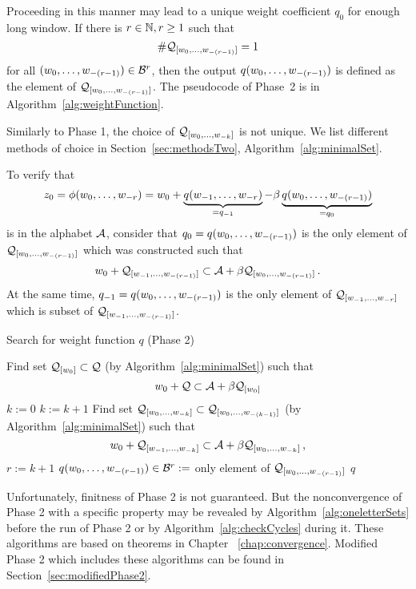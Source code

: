     Proceeding in this manner may lead to a unique weight coefficient $q_0$ for enough long window.     
    If there is $r\in\mathbb{N}, r\geq 1$ such that 
    $$
    \#\mathcal{Q}_{[w_{0}, \dots, w_{-(r-1)}]}=1
    $$
    for all $(w_{0}, \dots, w_{-(r-1)}) \in \mathcal{B}^r$, then the output $q(w_{0}, \dots, w_{-(r-1)})$ is defined as the element of $\mathcal{Q}_{[w_{0}, \dots, w_{-(r-1)}]}$. The pseudocode of Phase~2 is in  Algorithm~\ref{alg:weightFunction}. 
    
    Similarly to Phase 1, the choice of $\mathcal{Q}_{[w_{0}, \dots, w_{-k}]}$ is not unique. We list different methods of choice in Section~\ref{sec:methodsTwo}, Algorithm~\ref{alg:minimalSet}.
    
        
    To verify that 
$$
	z_0=\phi(w_{0}, \dots, w_{-r})=w_0+ \underbrace{q(w_{-1}, \dots, w_{-r})}_{=q_{-1}} - \beta \underbrace{q(w_{0}, \dots, w_{-(r-1)})}_{=q_0}
$$    
is in the alphabet $\mathcal{A}$, consider that $q_0=q(w_{0}, \dots, w_{-(r-1)})$ is the only element of $\mathcal{Q}_{[w_{0}, \dots, w_{-(r-1)}]}$ which was constructed such that 
$$
w_0 + \mathcal{Q}_{[w_{-1}, \dots, w_{-(r-1)}]} \subset \mathcal{A} +\beta \mathcal{Q}_{[w_{0}, \dots, w_{-(r-1)}]}\,.
$$
At the same time, $q_{-1}=q(w_{0}, \dots, w_{-(r-1)})$ is the only element of $\mathcal{Q}_{[w_{-1}, \dots, w_{-r}]}$ which is subset of $\mathcal{Q}_{[w_{-1}, \dots, w_{-(r-1)}]}$.

    

    
\begin{algorithm}
  \caption{Search for weight function $q$ (Phase 2)}
    \label{alg:weightFunction}
  \begin{algorithmic}[1]
        \STATE Find set $\mathcal{Q}_{[w_0]} \subset \mathcal{Q}$ (by Algorithm~\ref{alg:minimalSet}) such that
          $$
          w_0 + \mathcal{Q} \subset \mathcal{A} + \beta \mathcal{Q}_{[w_0]}
          $$
    \ENDFOR
    \STATE $k:=0$
        \STATE $k:= k +1$
            \STATE Find set $\mathcal{Q}_{[w_{0}, \dots, w_{-k}]} \subset \mathcal{Q}_{[w_{0}, \dots, w_{-(k-1)}]}$ (by Algorithm~\ref{alg:minimalSet}) such that
              $$
              w_0 + \mathcal{Q}_{[w_{-1}, \dots, w_{-k}]} \subset \mathcal{A} + \beta \mathcal{Q}_{[w_{0}, \dots, w_{-k}]}\,,
              $$
        \ENDFOR  
    \ENDWHILE  
    \STATE $r:= k+1$ 
        \STATE $q(w_{0}, \dots, w_{-(r-1)})\in \mathcal{B}^{r}:=$ only element of $\mathcal{Q}_{[w_{0}, \dots, w_{-(r-1)}]}$
    \ENDFOR
    \RETURN $q$
  \end{algorithmic}
\end{algorithm}

Unfortunately, finitness of Phase 2 is not guaranteed. But the nonconvergence of Phase 2 with a specific property may be revealed by Algorithm~\ref{alg:oneletterSets} before the run of Phase 2 or by Algorithm~\ref{alg:checkCycles} during it. These algorithms are based on theorems in Chapter ~\ref{chap:convergence}. Modified Phase 2 which includes these algorithms can be found in Section~\ref{sec:modifiedPhase2}.



